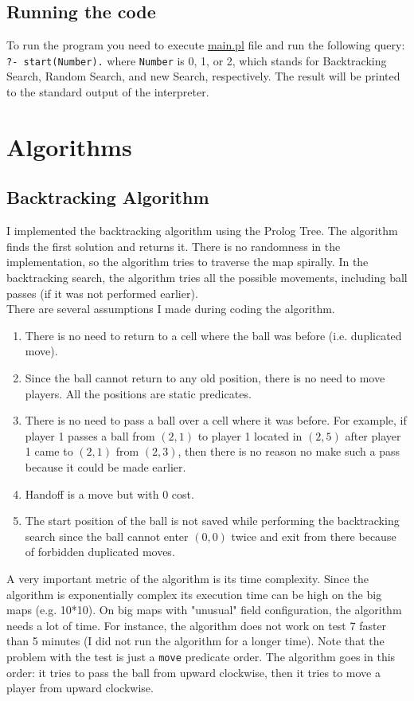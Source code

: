 \documentclass{article}
\begin{document}
\subsection{Running the code}
To run the program you need to execute \url{main.pl} file and run the following query: \texttt{?- start(Number).} where \texttt{Number} is 0, 1, or 2, which stands for Backtracking Search, Random Search, and new Search, respectively. The result will be printed to the standard output of the interpreter. 

\section{Algorithms}
\subsection{Backtracking Algorithm}
I implemented the backtracking algorithm using the Prolog Tree. The algorithm finds the first solution and returns it. There is no randomness in the implementation, so the algorithm tries to traverse the map spirally. In the backtracking search, the algorithm tries all the possible movements, including ball passes (if it was not performed earlier).\\
There are several assumptions I made during coding the algorithm.
\begin{enumerate}
	\item There is no need to return to a cell where the ball was before (i.e. duplicated move).
	\item Since the ball cannot return to any old position, there is no need to move players. All the positions are static predicates.
	\item There is no need to pass a ball over a cell where it was before. For example, if player 1 passes a ball from $(2, 1)$ to player 1 located in $(2, 5)$ after player 1 came to $(2, 1)$ from $(2, 3)$, then there is no reason no make such a pass because it could be made earlier.
	\item Handoff is a move but with 0 cost.
	\item The start position of the ball is not saved while performing the backtracking search since the ball cannot enter $(0, 0)$ twice and exit from there because of forbidden duplicated moves.
\end{enumerate}
A very important metric of the algorithm is its time complexity. Since the algorithm is exponentially complex its execution time can be high on the big maps (e.g. 10*10). On big maps with "unusual" field configuration, the algorithm needs a lot of time. For instance, the algorithm does not work on test 7 faster than 5 minutes (I did not run the algorithm for a longer time). Note that the problem with the test is just a \texttt{move} predicate order. The algorithm goes in this order: it tries to pass the ball from upward clockwise, then it tries to move a player from upward clockwise.
\end{document}

